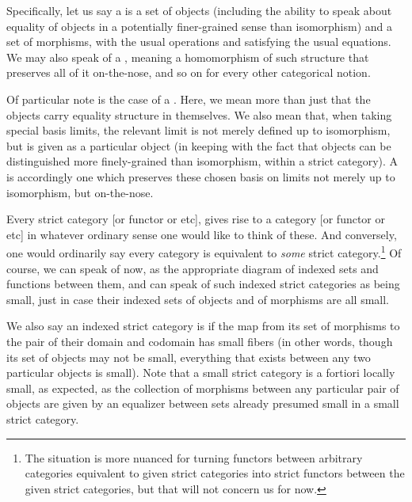 Specifically, let us say a  is a set of objects (including the ability to speak about equality of objects in a potentially finer-grained sense than isomorphism) and a set of morphisms, with the usual operations and satisfying the usual equations.  We may also speak of a , meaning a homomorphism of such structure that preserves all of it on-the-nose, and so on for every other categorical notion.

Of particular note is the case of a . Here, we mean more than just that the objects carry equality structure in themselves. We also mean that, when taking special basis limits, the relevant limit is not merely defined up to isomorphism, but is given as a particular object (in keeping with the fact that objects can be distinguished more finely-grained than isomorphism, within a strict category). A  is accordingly one which preserves these chosen basis on limits not merely up to isomorphism, but on-the-nose. 

Every strict category [or functor or etc], gives rise to a category [or functor or etc] in whatever ordinary sense one would like to think of these. And conversely, one would ordinarily say every category is equivalent to \emph{some} strict category.\footnote{The situation is more nuanced for turning functors between arbitrary categories equivalent to given strict categories into strict functors between the given strict categories, but that will not concern us for now.} Of course, we can speak of  now, as the appropriate diagram of indexed sets and functions between them, and can speak of such indexed strict categories as being small, just in case their indexed sets of objects and of morphisms are all small.

We also say an indexed strict category is  if the map from its set of morphisms to the pair of their domain and codomain has small fibers (in other words, though its set of objects may not be small, everything that exists between any two particular objects is small). Note that a small strict category is a fortiori locally small, as expected, as the collection of morphisms between any particular pair of objects are given by an equalizer between sets already presumed small in a small strict category.


